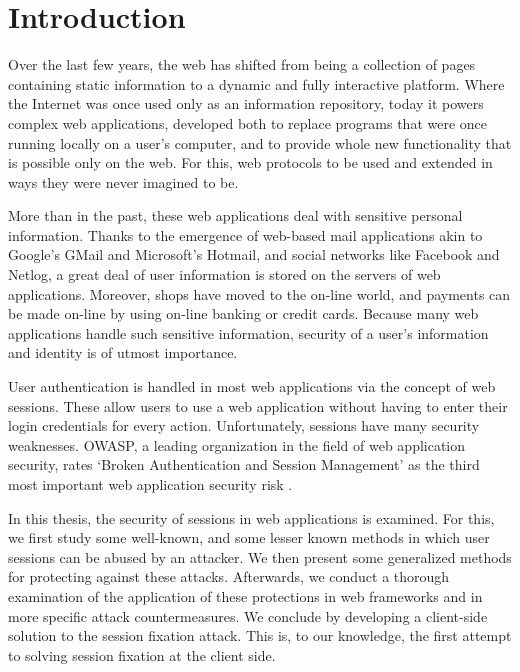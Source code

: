 \chapter{Introduction} %

Over the last few years, the web has shifted from being a collection of pages containing static information to a dynamic and fully interactive platform. Where the Internet was once used only as an information repository, today it powers complex web applications, developed both to replace programs that were once running locally on a user's computer, and to provide whole new functionality that is possible only on the web. For this, web protocols to be used and extended in ways they were never imagined to be.

More than in the past, these web applications deal with sensitive personal information. Thanks to the emergence of web-based mail applications akin to Google's GMail and Microsoft's Hotmail, and social networks like Facebook and Netlog, a great deal of user information is stored on the servers of web applications. Moreover, shops have moved to the on-line world, and payments can be made on-line by using on-line banking or credit cards. Because many web applications handle such sensitive information, security of a user's information and identity is of utmost importance.

User authentication is handled in most web applications via the concept of web sessions. These allow users to use a web application without having to enter their login credentials for every action. Unfortunately, sessions have many security weaknesses. OWASP, a leading organization in the field of web application security, rates `Broken Authentication and Session Management' as the third most important web application security risk \cite{Williams2010}.

In this thesis, the security of sessions in web applications is examined. For this, we first study some well-known, and some lesser known methods in which user sessions can be abused by an attacker. We then present some generalized methods for protecting against these attacks. Afterwards, we conduct a thorough examination of the application of these protections in web frameworks and in more specific attack countermeasures. We conclude by developing a client-side solution to the session fixation attack. This is, to our knowledge, the first attempt to solving session fixation at the client side.

